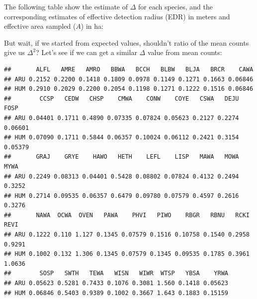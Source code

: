\documentclass[12pt,]{book}
\newenvironment{Shaded}{\begin{snugshade}}{\end{snugshade}}
\newcommand{\DataTypeTok}[1]{\textcolor[rgb]{0.13,0.29,0.53}{#1}}
\newcommand{\DecValTok}[1]{\textcolor[rgb]{0.00,0.00,0.81}{#1}}
\newcommand{\KeywordTok}[1]{\textcolor[rgb]{0.13,0.29,0.53}{\textbf{#1}}}
\newcommand{\NormalTok}[1]{#1}
\newcommand{\OperatorTok}[1]{\textcolor[rgb]{0.81,0.36,0.00}{\textbf{#1}}}
\newcommand{\StringTok}[1]{\textcolor[rgb]{0.31,0.60,0.02}{#1}}
\begin{document}
The following table show the estimate of \(\Delta\) for each species,
and the corresponding estimates of effective detection radius (EDR) in meters
and effective area sampled (\(A\)) in ha:

But wait, if we started from expected values, shouldn't ratio of
the mean counts give us \(\Delta^2\)?
Let's see if we can get a similar \(\Delta\) value from mean counts:

\begin{Shaded}
\end{Shaded}

\begin{verbatim}
##       ALFL   AMRE   AMRO   BBWA   BCCH   BLBW   BLJA   BRCR    CAWA
## ARU 0.2152 0.2200 0.1418 0.1809 0.0978 0.1149 0.1271 0.1663 0.06846
## HUM 0.2910 0.2029 0.2200 0.2054 0.1198 0.1271 0.1222 0.1516 0.06846
##        CCSP   CEDW   CHSP    CMWA    CONW    COYE   CSWA   DEJU    FOSP
## ARU 0.04401 0.1711 0.4890 0.07335 0.07824 0.05623 0.2127 0.2274 0.06601
## HUM 0.07090 0.1711 0.5844 0.06357 0.10024 0.06112 0.2421 0.3154 0.05379
##       GRAJ    GRYE    HAWO   HETH    LEFL    LISP   MAWA   MOWA   MYWA
## ARU 0.2249 0.08313 0.04401 0.5428 0.08802 0.07824 0.4132 0.2494 0.3252
## HUM 0.2714 0.09535 0.06357 0.6479 0.09780 0.07579 0.4597 0.2616 0.3276
##       NAWA  OCWA  OVEN   PAWA    PHVI   PIWO    RBGR   RBNU   RCKI   REVI
## ARU 0.1222 0.110 1.127 0.1345 0.07579 0.1516 0.10758 0.1540 0.2958 0.9291
## HUM 0.1002 0.132 1.306 0.1345 0.07579 0.1345 0.09535 0.1785 0.3961 1.0636
##        SOSP   SWTH   TEWA   WISN   WIWR  WTSP   YBSA    YRWA
## ARU 0.05623 0.5281 0.7433 0.1076 0.3081 1.560 0.1418 0.05623
## HUM 0.06846 0.5403 0.9389 0.1002 0.3667 1.643 0.1883 0.15159
\end{verbatim}

\begin{Shaded}
\end{Shaded}
\end{document}
